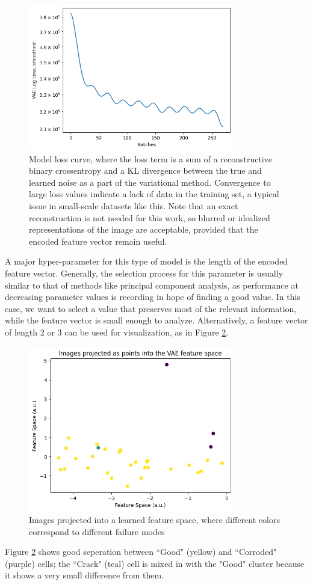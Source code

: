 \documentclass[conference]{IEEEtran}
\begin{document}
\begin{figure}[H]
    \includegraphics[width=9cm]{loss_curve.png}
    \centering
    \caption{Model loss curve, where the loss term is a sum of a reconstructive binary crossentropy and a KL divergence between the true and learned noise as a part of the variational method. 
    Convergence to large loss values indicate a lack of data in the training set, a typical issue in small-scale datasets like this. Note that an exact reconstruction is not needed for this work, so blurred or idealized representations of the image are acceptable, provided that the encoded feature vector remain useful.}
\label{fig:loss}
\end{figure}

A major hyper-parameter for this type of model is the length of the encoded feature vector. 
Generally, the selection process for this parameter is usually similar to that of methods like principal component analysis, as performance at decreasing parameter values is recording in hope of finding a good value. 
In this case, we want to select a value that preserves most of the relevant information, while the feature vector is small enough to analyze. 
Alternatively, a feature vector of length 2 or 3 can be used for visualization, as in Figure \ref{fig:vae_points}. 
\begin{figure}[h]
    \includegraphics[width=9cm]{cluster_VAE.png}
    \centering
    \caption{Images projected into a learned feature space, where different colors correspond to different failure modes}
\label{fig:vae_points}
\end{figure}
Figure \ref{fig:vae_points} shows good seperation between ``Good" (yellow) and ``Corroded" (purple) cells;  the ``Crack" (teal) cell is mixed in with the "Good" cluster because it shows a very small difference from them. 
\end{document}
